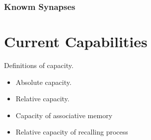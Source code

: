 \documentclass[12pt, a4paper]{article}
\begin{document}
\subsubsection{Knowm Synapses}

%
%
%
%
%
%
%
%
%
%

%


\section{Current Capabilities}

Definitions of capacity.

\begin{itemize}
\item Absolute capacity.
\item Relative capacity.
\item Capacity of associative memory
\item Relative capacity of recalling process
\end{itemize}
\end{document}
